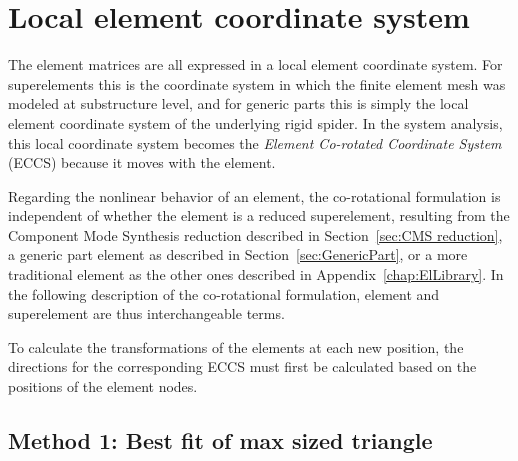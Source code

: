 %
%

%
%

\section{Local element coordinate system}
\label{sec:RefDef}

The element matrices are all expressed in a local element coordinate system.
For superelements this is the coordinate system in which the finite element
mesh was modeled at substructure level, and for generic parts this is simply
the local element coordinate system of the underlying rigid spider.
In the system analysis, this local coordinate system becomes the {\it Element
Co-rotated Coordinate System} (ECCS) because it moves with the element.

Regarding the nonlinear behavior of an element, the co-rotational formulation is
independent of whether the element is a reduced superelement, resulting from the
Component Mode Synthesis reduction described in Section~\ref{sec:CMS reduction},
a generic part element as described in Section~\ref{sec:GenericPart}, or a more
traditional element as the other ones described in Appendix~\ref{chap:ElLibrary}.
In the following description of the co-rotational formulation,
element and superelement are thus interchangeable terms.

To calculate the transformations of the elements at each new position,
the directions for the corresponding ECCS must first be calculated based on the
positions of the element nodes.

\subsection{Method 1: Best fit of max sized triangle}
\label{sec:RefDefMeth1}

